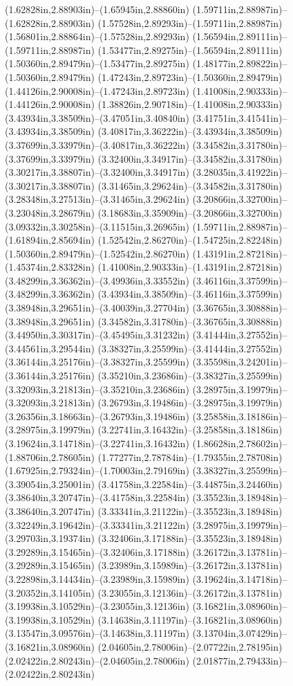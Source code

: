 (1.62828in,2.88903in)--(1.65945in,2.88860in) (1.59711in,2.88987in)--(1.62828in,2.88903in) (1.57528in,2.89293in)--(1.59711in,2.88987in) (1.56801in,2.88864in)--(1.57528in,2.89293in) (1.56594in,2.89111in)--(1.59711in,2.88987in) (1.53477in,2.89275in)--(1.56594in,2.89111in) (1.50360in,2.89479in)--(1.53477in,2.89275in) (1.48177in,2.89822in)--(1.50360in,2.89479in) (1.47243in,2.89723in)--(1.50360in,2.89479in) (1.44126in,2.90008in)--(1.47243in,2.89723in) (1.41008in,2.90333in)--(1.44126in,2.90008in) (1.38826in,2.90718in)--(1.41008in,2.90333in) (3.43934in,3.38509in)--(3.47051in,3.40840in) (3.41751in,3.41541in)--(3.43934in,3.38509in) (3.40817in,3.36222in)--(3.43934in,3.38509in) (3.37699in,3.33979in)--(3.40817in,3.36222in) (3.34582in,3.31780in)--(3.37699in,3.33979in) (3.32400in,3.34917in)--(3.34582in,3.31780in) (3.30217in,3.38807in)--(3.32400in,3.34917in) (3.28035in,3.41922in)--(3.30217in,3.38807in) (3.31465in,3.29624in)--(3.34582in,3.31780in) (3.28348in,3.27513in)--(3.31465in,3.29624in) (3.20866in,3.32700in)--(3.23048in,3.28679in) (3.18683in,3.35909in)--(3.20866in,3.32700in) (3.09332in,3.30258in)--(3.11515in,3.26965in) (1.59711in,2.88987in)--(1.61894in,2.85694in) (1.52542in,2.86270in)--(1.54725in,2.82248in) (1.50360in,2.89479in)--(1.52542in,2.86270in) (1.43191in,2.87218in)--(1.45374in,2.83328in) (1.41008in,2.90333in)--(1.43191in,2.87218in) (3.48299in,3.36362in)--(3.49936in,3.33552in) (3.46116in,3.37599in)--(3.48299in,3.36362in) (3.43934in,3.38509in)--(3.46116in,3.37599in) (3.38948in,3.29651in)--(3.40039in,3.27704in) (3.36765in,3.30888in)--(3.38948in,3.29651in) (3.34582in,3.31780in)--(3.36765in,3.30888in) (3.44950in,3.30317in)--(3.45495in,3.31232in) (3.41444in,3.27552in)--(3.44561in,3.29544in) (3.38327in,3.25599in)--(3.41444in,3.27552in) (3.36144in,3.25176in)--(3.38327in,3.25599in) (3.35598in,3.24201in)--(3.36144in,3.25176in) (3.35210in,3.23686in)--(3.38327in,3.25599in) (3.32093in,3.21813in)--(3.35210in,3.23686in) (3.28975in,3.19979in)--(3.32093in,3.21813in) (3.26793in,3.19486in)--(3.28975in,3.19979in) (3.26356in,3.18663in)--(3.26793in,3.19486in) (3.25858in,3.18186in)--(3.28975in,3.19979in) (3.22741in,3.16432in)--(3.25858in,3.18186in) (3.19624in,3.14718in)--(3.22741in,3.16432in) (1.86628in,2.78602in)--(1.88706in,2.78605in) (1.77277in,2.78784in)--(1.79355in,2.78708in) (1.67925in,2.79324in)--(1.70003in,2.79169in) (3.38327in,3.25599in)--(3.39054in,3.25001in) (3.41758in,3.22584in)--(3.44875in,3.24460in) (3.38640in,3.20747in)--(3.41758in,3.22584in) (3.35523in,3.18948in)--(3.38640in,3.20747in) (3.33341in,3.21122in)--(3.35523in,3.18948in) (3.32249in,3.19642in)--(3.33341in,3.21122in) (3.28975in,3.19979in)--(3.29703in,3.19374in) (3.32406in,3.17188in)--(3.35523in,3.18948in) (3.29289in,3.15465in)--(3.32406in,3.17188in) (3.26172in,3.13781in)--(3.29289in,3.15465in) (3.23989in,3.15989in)--(3.26172in,3.13781in) (3.22898in,3.14434in)--(3.23989in,3.15989in) (3.19624in,3.14718in)--(3.20352in,3.14105in) (3.23055in,3.12136in)--(3.26172in,3.13781in) (3.19938in,3.10529in)--(3.23055in,3.12136in) (3.16821in,3.08960in)--(3.19938in,3.10529in) (3.14638in,3.11197in)--(3.16821in,3.08960in) (3.13547in,3.09576in)--(3.14638in,3.11197in) (3.13704in,3.07429in)--(3.16821in,3.08960in) (2.04605in,2.78006in)--(2.07722in,2.78195in) (2.02422in,2.80243in)--(2.04605in,2.78006in) (2.01877in,2.79433in)--(2.02422in,2.80243in) 